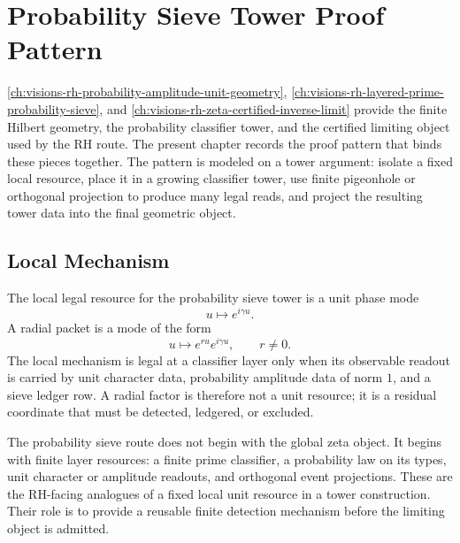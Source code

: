\chapter{Probability Sieve Tower Proof Pattern}
\label{ch:visions-rh-probability-sieve-tower-proof-pattern}

\autoref{ch:visions-rh-probability-amplitude-unit-geometry},
\autoref{ch:visions-rh-layered-prime-probability-sieve}, and
\autoref{ch:visions-rh-zeta-certified-inverse-limit} provide the
finite Hilbert geometry, the probability classifier tower, and the
certified limiting object used by the RH route.  The present chapter
records the proof pattern that binds these pieces together.  The
pattern is modeled on a tower argument: isolate a fixed local resource,
place it in a growing classifier tower, use finite pigeonhole or
orthogonal projection to produce many legal reads, and project the
resulting tower data into the final geometric object.

\section{Local Mechanism}
\label{sec:rh-probability-sieve-tower-local-mechanism}

\begin{definition}
\label{def:rh-unit-phase-local-mechanism}
The local legal resource for the probability sieve tower is a unit
phase mode
$$
u\longmapsto e^{i\gamma u}.
$$
A radial packet is a mode of the form
$$
u\longmapsto e^{ru}e^{i\gamma u},
\qquad
r\ne0.
$$
The local mechanism is legal at a classifier layer only when its
observable readout is carried by unit character data, probability
amplitude data of norm $1$, and a sieve ledger row.  A radial factor is
therefore not a unit resource; it is a residual coordinate that must be
detected, ledgered, or excluded.
\end{definition}

\begin{principle}
\label{prin:rh-fixed-local-sieve-mechanism}
The probability sieve route does not begin with the global zeta object.
It begins with finite layer resources: a finite prime classifier, a
probability law on its types, unit character or amplitude readouts, and
orthogonal event projections.  These are the RH-facing analogues of a
fixed local unit resource in a tower construction.  Their role is to
provide a reusable finite detection mechanism before the limiting
object is admitted.
\end{principle}

